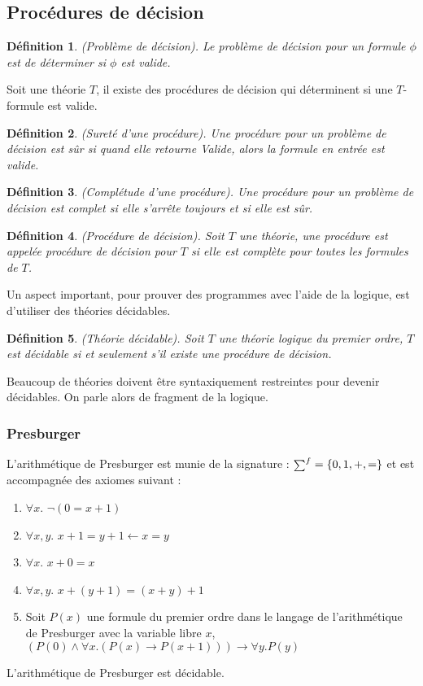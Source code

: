 \documentclass[11pt,openany]{article}
\newcommand\smallsum{\mathsmaller\sum}
\newtheorem{definition}{D\'efinition}[subsection]
\begin{document}
 	\subsection{Proc\'edures de d\'ecision}
 	\begin{definition}
 	(Probl\`eme de d\'ecision). Le probl\`eme de d\'ecision pour un formule $\phi$ est de d\'eterminer si $\phi$ est valide.
 	\end{definition}
 	Soit une th\'eorie $T$, il existe des proc\'edures de d\'ecision qui d\'eterminent si une $T$-formule est valide.
 	\begin{definition}
 	(Suret\'e d'une proc\'edure). Une proc\'edure pour un probl\`eme de d\'ecision est s\^ur si quand elle retourne \textit{Valide}, alors la formule en entr\'ee est valide.
 	\end{definition}
 	\begin{definition}
 		(Compl\'etude d'une proc\'edure). Une proc\'edure pour un probl\`eme de d\'ecision est complet si elle s'arr\^ete toujours et si elle est s\^ur.
 	\end{definition}
 	\begin{definition}
 	(Proc\'edure de d\'ecision). Soit $T$ une th\'eorie, une proc\'edure est appel\'ee \textit{proc\'edure de d\'ecision pour $T$} si elle est compl\`ete pour toutes les formules de $T$. 
 	\end{definition} 	
 	Un aspect important, pour prouver des programmes avec l'aide de la logique, est d'utiliser des th\'eories d\'ecidables.
	\begin{definition}
	(Th\'eorie d\'ecidable). Soit $T$ une th\'eorie logique du premier ordre, $T$ est d\'ecidable si et seulement s'il existe une proc\'edure de d\'ecision.
	\end{definition}
Beaucoup de th\'eories doivent \^etre syntaxiquement restreintes pour devenir d\'ecidables. On parle alors de fragment de la logique.		\				\subsubsection{Presburger}
		L'arithm\'etique de Presburger est munie de la signature : $\smallsum^{f}=\{0,1,+,=\}$ et est accompagn\'ee des axiomes suivant :
		\begin{enumerate}
		\item $\forall x.$ $\neg(0=x+1)$
		\item $\forall x,y.$ $x + 1=y+1\leftarrow x=y$
		\item $\forall x.$ $x+0=x$
		\item $\forall x,y.$ $x+(y+1)=(x+y)+1$
		\item Soit $P(x)$ une formule du premier ordre dans le langage de l'arithm\'etique de Presburger avec la variable libre $x$,\\
		$(P(0)\land\forall x.(P(x)\rightarrow P(x+1)))\rightarrow\forall y. P(y)$
		\end{enumerate}
		L'arithm\'etique de Presburger est d\'ecidable.
		
\end{document}
